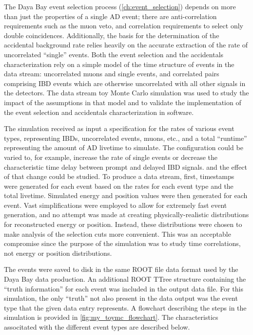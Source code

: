 The Daya Bay event selection process (\cref{ch:event_selection})
depends on more than just the properties of a single AD event;
there are anti-correlation requirements such as the muon veto,
and correlation requirements to select only double coincidences.
Additionally, the basis for the determination of the accidental background rate
relies heavily on the accurate extraction of
the rate of uncorrelated ``single'' events.
Both the event selection and the accidentals characterization
rely on a simple model of the time structure of events in the data stream:
uncorrelated muons and single events,
and correlated pairs comprising IBD events
which are otherwise uncorrelated with all other signals in the detectors.
The data stream toy Monte Carlo simulation was used
to study the impact of the assumptions in that model
and to validate the implementation of
the event selection and accidentals characterization
in software.

The simulation received as input
a specification for the rates of various event types,
representing IBDs, uncorrelated events, muons, etc.,
and a total ``runtime'' representing the amount of AD livetime to simulate.
The configuration could be varied to, for example,
increase the rate of single events
or decrease the characteristic time delay between prompt and delayed IBD signals.
and the effect of that change could be studied.
To produce a data stream,
first, timestamps were generated for each event
based on the rates for each event type and the total livetime.
Simulated energy and position values were then generated for each event.
Vast simplifications were employed to allow for
extremely fast event generation,
and no attempt was made at creating
physically-realistic distributions for
reconstructed energy or position.
Instead, these distributions were chosen to make analysis
of the selection cuts more convenient.
This was an acceptable compromise since the purpose of the simulation
was to study time correlations, not energy or position distributions.

The events were saved to disk in the same ROOT file data format
used by the Daya Bay data production.
An additional ROOT TTree structure containing the ``truth information''
for each event was included in the output data file.
For this simulation, the only ``truth'' not also present in the data output
was the event type that the given data entry represents.
A flowchart describing the steps in the simulation
is provided in \cref{fig:my_toymc_flowchart}.
The characteristics associtated with the different event types
are described below.

